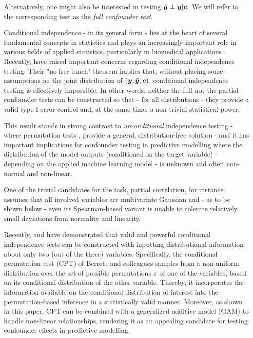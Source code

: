 \documentclass{article}
\begin{document}
Alternatively, one might also be interested in testing $\yhat \independent \y | \c$. We will refer to the corresponding test as the \emph{full confounder test}.

 Conditional independence - in its general form - lies at the heart of several fundamental concepts in statistics and  plays an increasingly important role in various fields of applied statistics, particularly in biomedical applications \citep{spirtes2000causation, fiedler2011mediation, peters2016causal, candes2016panning}. Recently, \cite{shah2020hardness} have raised important concerns regarding conditional independence testing.
 Their "no free lunch" theorem implies that, without placing some assumptions on the joint distribution of $(\boldsymbol{y}, \boldsymbol{\hat{y}}, \boldsymbol{c})$, conditional independence testing is effectively impossible. In other words, neither the full nor the partial confounder tests can be constructed so that - for all distributions - they provide a valid type I error control and, at the same time, a non-trivial statistical power.

This result stands in strong contrast to \emph{unconditional} independence testing - where permutation tests  \citep{pitman1937significance, fisher1942189}, provide a general, distribution-free solution - and it has important implications for confounder testing in predictive modelling where the distribution of the model outputs (conditioned on the target variable) - depending on the applied machine learning model - is unknown and often non-normal and non-linear.

One of the trivial candidates for the task, partial correlation, for instance assumes that all involved variables are multivariate Gaussian and - as to be shown below - even its Spearman-based variant is unable to tolerate relatively small deviations from normality and linearity.

Recently, \cite{candes2016panning} and \cite{berrett2020conditional} have demonstrated that valid and powerful conditional independence tests can be constructed with inputting distributional information about only two (out of the three) variables.
Specifically, the conditional permutation test (CPT) of Berrett and colleagues samples from a non-uniform distribution over the set of possible permutations $\pi$ of one of the variables, based on its conditional distribution of the other variable. Thereby, it incorporates the information available on the conditional distribution of interest into the permutation-based inference in a statistically valid manner. Moreover, as shown in this paper, CPT can be combined with a generalized additive model (GAM) to handle non-linear relationships, rendering it as an appealing candidate for testing confounder effects in predictive modelling.
\end{document}
